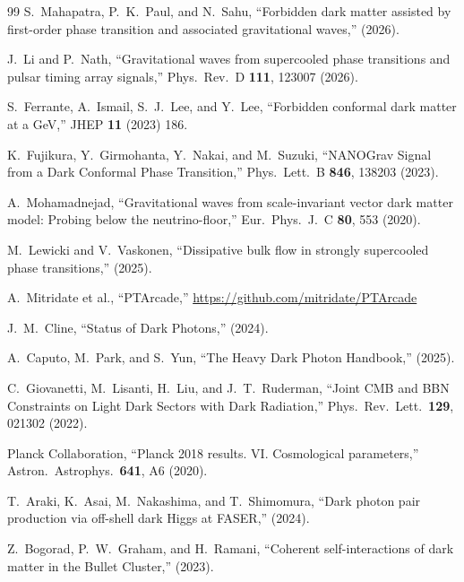 \documentclass[12pt,a4paper]{article}
\begin{document}
\begin{thebibliography}{99}
S.~Mahapatra, P.~K.~Paul, and N.~Sahu,
``Forbidden dark matter assisted by first-order phase transition and associated gravitational waves,''
(2026).

J.~Li and P.~Nath,
``Gravitational waves from supercooled phase transitions and pulsar timing array signals,''
Phys.\ Rev.\ D \textbf{111}, 123007 (2026).

S.~Ferrante, A.~Ismail, S.~J.~Lee, and Y.~Lee,
``Forbidden conformal dark matter at a GeV,''
JHEP \textbf{11} (2023) 186.

K.~Fujikura, Y.~Girmohanta, Y.~Nakai, and M.~Suzuki,
``NANOGrav Signal from a Dark Conformal Phase Transition,''
Phys.\ Lett.\ B \textbf{846}, 138203 (2023).

A.~Mohamadnejad,
``Gravitational waves from scale-invariant vector dark matter model: Probing below the neutrino-floor,''
Eur.\ Phys.\ J.\ C \textbf{80}, 553 (2020).

M.~Lewicki and V.~Vaskonen,
``Dissipative bulk flow in strongly supercooled phase transitions,''
(2025).

A.~Mitridate et al.,
``PTArcade,''
\url{https://github.com/mitridate/PTArcade}

J.~M.~Cline,
``Status of Dark Photons,''
(2024).

A.~Caputo, M.~Park, and S.~Yun,
``The Heavy Dark Photon Handbook,''
(2025).

C.~Giovanetti, M.~Lisanti, H.~Liu, and J.~T.~Ruderman,
``Joint CMB and BBN Constraints on Light Dark Sectors with Dark Radiation,''
Phys.\ Rev.\ Lett.\ \textbf{129}, 021302 (2022).

Planck Collaboration,
``Planck 2018 results. VI. Cosmological parameters,''
Astron.\ Astrophys.\ \textbf{641}, A6 (2020).

T.~Araki, K.~Asai, M.~Nakashima, and T.~Shimomura,
``Dark photon pair production via off-shell dark Higgs at FASER,''
(2024).

Z.~Bogorad, P.~W.~Graham, and H.~Ramani,
``Coherent self-interactions of dark matter in the Bullet Cluster,''
(2023).


\end{thebibliography}
\end{document}
